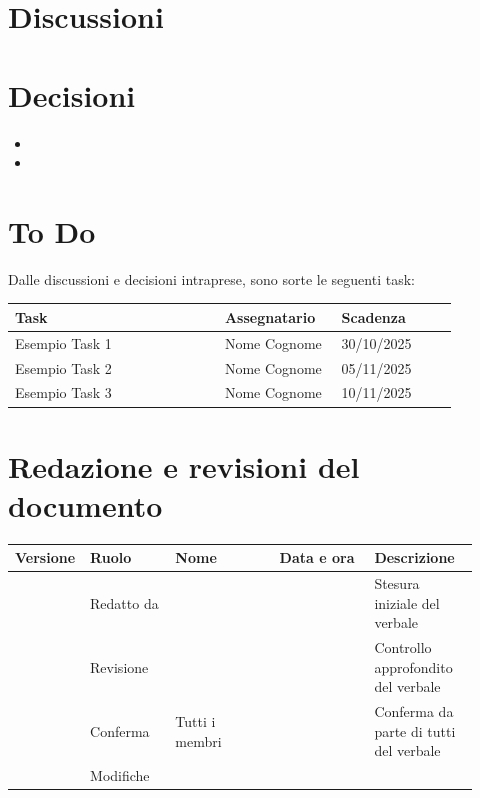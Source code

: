 \documentclass[a4paper,12pt]{article}
\begin{document}
\section{Discussioni}

\section{Decisioni}
\begin{itemize}
    \item %
    \item %
\end{itemize}

\section{To Do}
Dalle discussioni e decisioni intraprese, sono sorte le seguenti task:

\begin{center}
\small
\renewcommand{\arraystretch}{1.2} 
\begin{tabular}{|p{0.45\linewidth}|p{0.25\linewidth}|p{0.25\linewidth}|}
\hline
\rowcolor{gray!60} 
\textbf{Task} & \textbf{Assegnatario} & \textbf{Scadenza} \\
\hline
\rowcolor{white}
Esempio Task 1 & Nome Cognome & 30/10/2025 \\
\hline
\rowcolor{gray!20}
Esempio Task 2 & Nome Cognome & 05/11/2025 \\
\hline
\rowcolor{white}
Esempio Task 3 & Nome Cognome & 10/11/2025 \\
\hline
\end{tabular}
\end{center}

\clearpage
\section{Redazione e revisioni del documento}

\begin{center}
\small
\renewcommand{\arraystretch}{1.2} 
\begin{tabular}{|p{0.1\linewidth}|p{0.18\linewidth}|p{0.22\linewidth}|p{0.20\linewidth}|p{0.22\linewidth}|}
\hline
\rowcolor{gray!60} 
\textbf{Versione} & \textbf{Ruolo} & \textbf{Nome} & \textbf{Data e ora} & \textbf{Descrizione} \\
\hline
\rowcolor{white}
 & Redatto da &  &  & Stesura iniziale del verbale \\
\hline
\rowcolor{gray!20}
 & Revisione &  &  & Controllo approfondito del verbale \\
\hline
\rowcolor{white}
 & Conferma & Tutti i membri &  & Conferma da parte di tutti del verbale \\
\hline
\rowcolor{gray!20}
 & Modifiche &  &  &  \\
\hline
\end{tabular}
\end{center}


\end{document}
